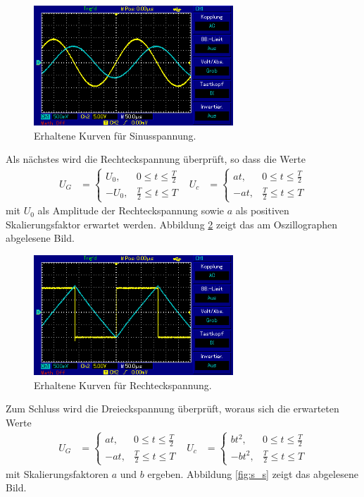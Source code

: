 \begin{figure}[H]
  \centering
  \includegraphics[height=4.5cm]{oz5.png}
  \caption{Erhaltene Kurven für Sinusspannung.}
  \label{fig:sin_r}
\end{figure}


Als nächstes wird die Rechteckspannung überprüft, so dass die Werte
\begin{align}
  U_G &=
  \begin{cases}
    U_0 , &  0 \leq t \leq \frac{T}{2} \\
    -U_0 , & \frac{T}{2} \leq t \leq T
  \end{cases}
   & U_c &=
  \begin{cases}
    at , &  0 \leq t \leq \frac{T}{2} \\
    -at , & \frac{T}{2} \leq t \leq T
  \end{cases}
\end{align}
mit $U_0$ als Amplitude der Rechteckspannung sowie $a$ als positiven Skalierungsfaktor erwartet werden.
Abbildung \ref{fig:rechteck_s} zeigt das am Oszillographen abgelesene Bild.

\begin{figure}[H]
  \centering
  \includegraphics[height=4.5cm]{oz7.png}
  \caption{Erhaltene Kurven für Rechteckspannung.}
  \label{fig:rechteck_s}
\end{figure}

Zum Schluss wird die Dreieckspannung überprüft, woraus sich die erwarteten Werte
\begin{align}
  U_G &=
  \begin{cases}
    at , &  0 \leq t \leq \frac{T}{2} \\
    -at , & \frac{T}{2} \leq t \leq T
  \end{cases}
  & U_c &=
  \begin{cases}
    b t^2 , &  0 \leq t \leq \frac{T}{2} \\
    -b t^2 , & \frac{T}{2} \leq t \leq T
  \end{cases}
\end{align}
mit Skalierungsfaktoren $a$ und $b$ ergeben.
Abbildung \ref{fig:s_s} zeigt das abgelesene Bild.

